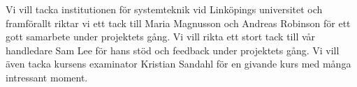 Vi vill tacka institutionen för systemteknik vid Linköpings universitet och framförallt riktar vi ett tack till Maria Magnusson och Andreas Robinson för ett gott samarbete under projektets gång. Vi vill rikta ett stort tack till vår handledare Sam Lee för hans stöd och feedback under projektets gång. Vi vill även tacka kursens examinator Kristian Sandahl för en givande kurs med många intressant moment.

